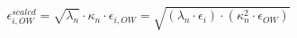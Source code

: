 \begin{center}
    \begin{equation}
        \epsilon_{i,OW}^{scaled}=\sqrt{\lambda_n}\cdot \kappa_n\cdot \epsilon_{i,OW}=
         \sqrt{(\lambda_n\cdot\epsilon_i)\cdot(\kappa_n^2\cdot\epsilon_{OW})}
    \label{eq:wat_scaling}
    \end{equation}
\end{center}